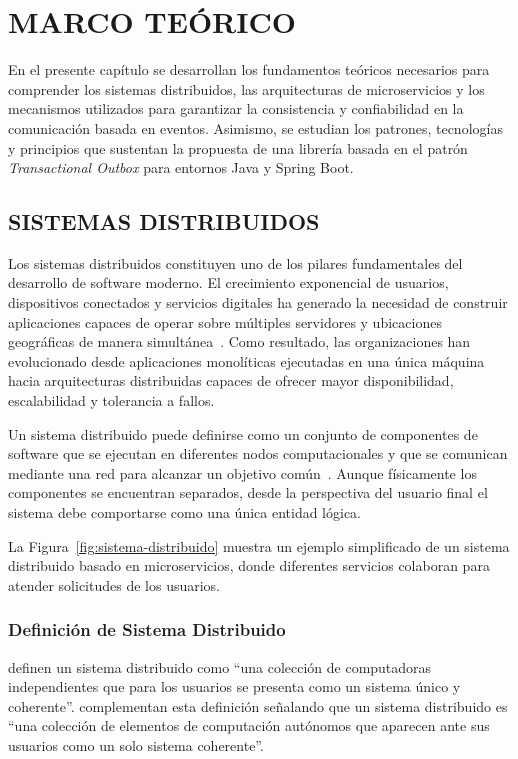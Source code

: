 \clearpage
\chapter{MARCO TEÓRICO}

En el presente capítulo se desarrollan los fundamentos teóricos necesarios para comprender los sistemas distribuidos, las arquitecturas de microservicios y los mecanismos utilizados para garantizar la consistencia y confiabilidad en la comunicación basada en eventos. Asimismo, se estudian los patrones, tecnologías y principios que sustentan la propuesta de una librería basada en el patrón \textit{Transactional Outbox} para entornos Java y Spring Boot.

\section{SISTEMAS DISTRIBUIDOS}

Los sistemas distribuidos constituyen uno de los pilares fundamentales del desarrollo de software moderno. El crecimiento exponencial de usuarios, dispositivos conectados y servicios digitales ha generado la necesidad de construir aplicaciones capaces de operar sobre múltiples servidores y ubicaciones geográficas de manera simultánea~\parencite{tanenbaum2017}. Como resultado, las organizaciones han evolucionado desde aplicaciones monolíticas ejecutadas en una única máquina hacia arquitecturas distribuidas capaces de ofrecer mayor disponibilidad, escalabilidad y tolerancia a fallos.

Un sistema distribuido puede definirse como un conjunto de componentes de software que se ejecutan en diferentes nodos computacionales y que se comunican mediante una red para alcanzar un objetivo común~\parencite{coulouris2012}. Aunque físicamente los componentes se encuentran separados, desde la perspectiva del usuario final el sistema debe comportarse como una única entidad lógica.

La Figura~\ref{fig:sistema-distribuido} muestra un ejemplo simplificado de un sistema distribuido basado en microservicios, donde diferentes servicios colaboran para atender solicitudes de los usuarios.



\subsection{Definición de Sistema Distribuido}

\textcite{coulouris2012} definen un sistema distribuido como ``una colección de computadoras independientes que para los usuarios se presenta como un sistema único y coherente''. \textcite{tanenbaum2017} complementan esta definición señalando que un sistema distribuido es ``una colección de elementos de computación autónomos que aparecen ante sus usuarios como un solo sistema coherente''.

